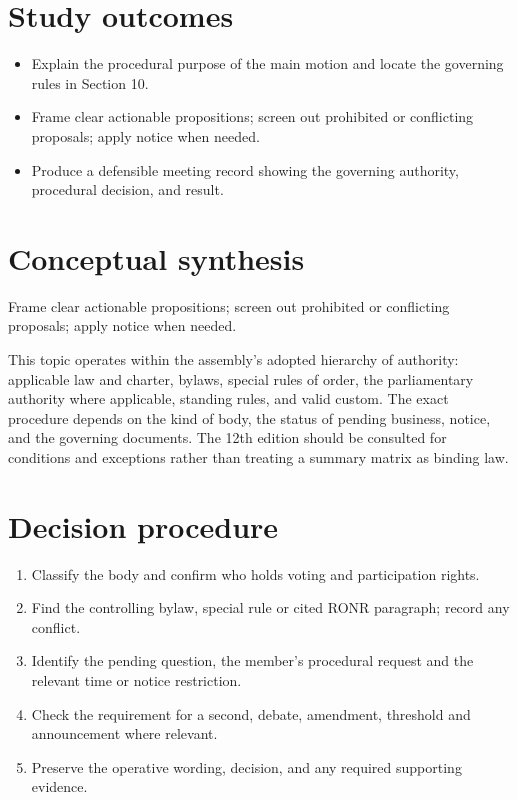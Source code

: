 \documentclass[11pt]{article}
\begin{document}
\SuiteOpen
{}
\section{Study outcomes}
\begin{itemize}[leftmargin=*,itemsep=4pt]
\item Explain the procedural purpose of the main motion and locate the governing rules in Section 10.
\item Frame clear actionable propositions; screen out prohibited or conflicting proposals; apply notice when needed.
\item Produce a defensible meeting record showing the governing authority, procedural decision, and result.
\end{itemize}

\section{Conceptual synthesis}
Frame clear actionable propositions; screen out prohibited or conflicting proposals; apply notice when needed.

This topic operates within the assembly’s adopted hierarchy of authority: applicable law and charter, bylaws, special rules of order, the parliamentary authority where applicable, standing rules, and valid custom. The exact procedure depends on the kind of body, the status of pending business, notice, and the governing documents. The 12th edition should be consulted for conditions and exceptions rather than treating a summary matrix as binding law.
\section{Decision procedure}
\begin{enumerate}[leftmargin=*,itemsep=4pt]
\item Classify the body and confirm who holds voting and participation rights.
\item Find the controlling bylaw, special rule or cited RONR paragraph; record any conflict.
\item Identify the pending question, the member’s procedural request and the relevant time or notice restriction.
\item Check the requirement for a second, debate, amendment, threshold and announcement where relevant.
\item Preserve the operative wording, decision, and any required supporting evidence.
\end{enumerate}
\end{document}
